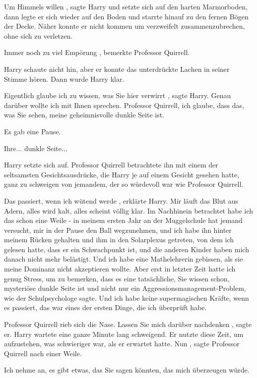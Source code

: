 \glqq Um Himmels willen\grqq{} , sagte Harry und setzte sich auf den harten
Marmorboden, dann legte er sich wieder auf den Boden und starrte hinauf zu den
fernen Bögen der Decke. Näher konnte er nicht kommen um verzweifelt
zusammenzubrechen, ohne sich zu verletzen.

\glqq Immer noch zu viel Empörung\grqq{} , bemerkte Professor Quirrell.

Harry schaute nicht hin, aber er konnte das unterdrückte Lachen in seiner Stimme
hören. Dann wurde Harry klar.

\glqq Eigentlich glaube ich zu wissen, was Sie hier verwirrt\grqq{} , sagte
Harry. \glqq Genau darüber wollte ich mit Ihnen sprechen. Professor Quirrell,
ich glaube, dass das, was Sie sehen, meine geheimnisvolle dunkle Seite
ist.\grqq{}

Es gab eine Pause.

\glqq Ihre... dunkle Seite...\grqq{}

Harry setzte sich auf. Professor Quirrell betrachtete ihn mit einem der
seltsamsten Gesichtsausdrücke, die Harry je auf einem Gesicht gesehen hatte,
ganz zu schweigen von jemandem, der so würdevoll war wie Professor Quirrell.

\glqq Das passiert, wenn ich wütend werde\grqq{} , erklärte Harry. \glqq Mir
läuft das Blut aus Adern, alles wird kalt, alles scheint völlig klar. Im
Nachhinein betrachtet habe ich das schon eine Weile - in meinem ersten Jahr an
der Muggelschule hat jemand versucht, mir in der Pause den Ball wegzunehmen, und
ich habe ihn hinter meinem Rücken gehalten und ihm in den Solarplexus getreten,
von dem ich gelesen hatte, dass er ein Schwachpunkt ist, und die anderen Kinder
haben mich danach nicht mehr belästigt. Und ich habe eine Mathelehrerin
gebissen, als sie meine Dominanz nicht akzeptieren wollte. Aber erst in letzter
Zeit hatte ich genug Stress, um zu bemerken, dass es eine tatsächliche, Sie
wissen schon, mysteriöse dunkle Seite ist und nicht nur ein
Aggressionsmanagement-Problem, wie der Schulpsychologe sagte. Und ich habe keine
supermagischen Kräfte, wenn es passiert, das war eines der ersten Dinge, die ich
überprüft habe.\grqq{}

Professor Quirrell rieb sich die Nase. \glqq Lassen Sie mich darüber
nachdenken\grqq{} , sagte er. Harry wartete eine ganze Minute lang schweigend.
Er nutzte diese Zeit, um aufzustehen, was schwieriger war, als er erwartet
hatte. \glqq Nun\grqq{} , sagte Professor Quirrell nach einer Weile.

\glqq Ich nehme an, es gibt etwas, das Sie sagen könnten, das mich überzeugen
würde.\grqq{}

